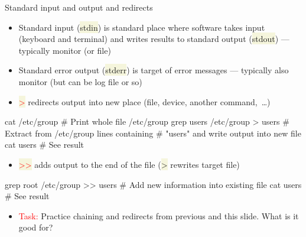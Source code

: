 \documentclass[compress, xelatex, 11pt, xcolor=svgnames, aspectratio=169,
	hyperref={
		bookmarks=true,
		unicode=true,
		colorlinks=true,
		pdftitle={Linux, command line and MetaCentrum},
		plainpages=false,
		pdfauthor={Vojtech Zeisek},
		pdfsubject={Course about use of Linux command line, writing shell scripts and using MetaCentrum of CESNET},
		pdfcreator={XeLaTeX},
		pdfkeywords={Linux, GNU, BASH, shell, command line, MetaCentrum},
		linkcolor=DarkRed, %
		anchorcolor=DarkBlue, %
		citecolor=Indigo, %
		filecolor=NavyBlue, %
		menucolor=DarkMagenta, %
		urlcolor=DarkBlue, %
		},
	url={hyphens, lowtilde} %
	]{beamer}
\renewcommand{\texttt}[1]{\colorbox{Beige}{{\ttfamily #1}}}
\renewcommand{\alert}[1]{\textcolor{red}{#1}}
\begin{document}
\begin{frame}[fragile]{Standard input and output and redirects}
	\begin{itemize}
		\item Standard input (\texttt{stdin}) is standard place where software takes input (keyboard and terminal) and writes results to standard output (\texttt{stdout}) --- typically monitor (or file)
		\item Standard error output (\texttt{stderr}) is target of error messages --- typically also monitor (but can be log file or so)
		\item \alert{\texttt{\textgreater}} redirects output into new place (file, device, another command,~\ldots)
	\end{itemize}
	\vfill
	\begin{bashcode}
    cat /etc/group # Print whole file /etc/group
    grep users /etc/group > users # Extract from /etc/group lines containing
                                  # "users" and write output into new file
    cat users # See result
	\end{bashcode}
	\vfill
	\begin{itemize}
		\item \alert{\texttt{\textgreater\textgreater}} adds output to the end of the file (\texttt{\textgreater} rewrites target file)
	\end{itemize}
	\vfill
	\begin{bashcode}
    grep root /etc/group >> users # Add new information into existing file
    cat users # See result
	\end{bashcode}
	\vfill
	\begin{itemize}
		\item \alert{Task:} Practice chaining and redirects from previous and this slide. What is it good for?
	\end{itemize}
\end{frame}
\end{document}
